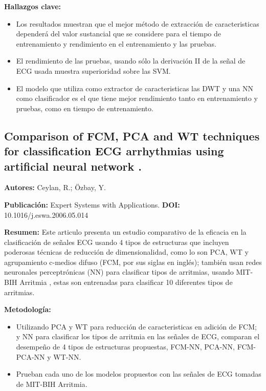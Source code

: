 \documentclass[spanish,11pt,letterpaper,oneside]{memoir}
\begin{document}
\textbf{Hallazgos clave:}
\begin{itemize}
	\item Los resultados muestran que el mejor método de extracción de caracteristicas dependerá del valor sustancial que se considere para el tiempo de entrenamiento y rendimiento en el entrenamiento y las pruebas.
	\item El rendimiento de las pruebas, usando sólo la derivación II de la señal de ECG usada muestra superioridad sobre las SVM.
	\item El modelo que utiliza como extractor de caracteristicas las DWT y una NN como clasificador es el que tiene mejor rendimiento tanto en entrenamiento y pruebas, como en tiempo de entrenamiento.
\end{itemize}

\subsection{Comparison of FCM, PCA and WT techniques for classification ECG arrhythmias using artificial neural network \cite{Ceylan07}.}

\textbf{Autores:} Ceylan, R.; Özbay, Y.

\textbf{Publicación:} Expert Systems with Applications.
\textbf{DOI:} 10.1016/j.eswa.2006.05.014

\textbf{Resumen:} Este articulo presenta un estudio comparativo de la eficacia en la clasificación de señales ECG usando 4 tipos de estructuras que incluyen poderosas técnicas de reducción de dimensionalidad, como lo son PCA, WT y agrupamiento c-medios difuso (FCM, por sus siglas en inglés); también usan redes neuronales perceptrónicas (NN) para clasificar tipos de arritmias, usando MIT-BIH Arritmia \cite{arritmiadb}, estas son entrenadas para clasificar 10 diferentes tipos de arritmias. 

\textbf{Metodología:}
\begin{itemize}
	\item Utilizando PCA y WT para reducción de caracteristicas en adición de FCM; y NN para clasificar los tipos de arritmia en las señales de ECG, comparan el desempeño de 4 tipos de estructuras propuestas, FCM-NN, PCA-NN, FCM-PCA-NN y WT-NN.
	\item Prueban cada uno de los modelos propuestos con las señales de ECG tomadas de MIT-BIH Arritmia\cite{arritmiadb}.
\end{itemize}
\end{document}
